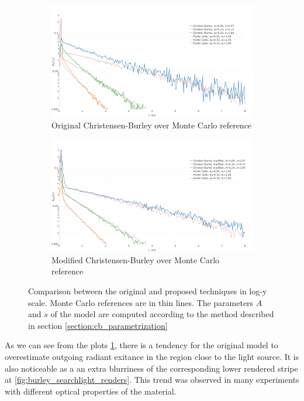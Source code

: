 \begin{figure}[h]
    \centering
    \begin{subfigure}{\textwidth}
        \includegraphics[width=\textwidth]{imgs/plots/cb_original_fitting}
        \caption{Original Christensen-Burley over Monte Carlo reference}
    \end{subfigure}
    \begin{subfigure}{\textwidth}
        \includegraphics[width=\textwidth]{imgs/plots/cb_modified_fitting}
        \caption{Modified Christensen-Burley over Monte Carlo reference}
    \end{subfigure}

    \caption{Comparison between the original and proposed techniques in log-y
    scale. Monte Carlo references are in thin lines. The parameters $A$ and $s$ of the model are
    computed according to the method described in section \ref{section:cb_parametrization}}
    \label{fig:burley_fitting}
\end{figure}

As we can see from the plots \ref{fig:burley_fitting}, there is a tendency for
the original model to overestimate outgoing radiant exitance in the region close
to the light source. It is also noticeable as a an extra blurriness of the corresponding
lower rendered stripe at \ref{fig:burley_searchlight_renders}. This trend was observed in many
experiments with different optical properties of the material.

